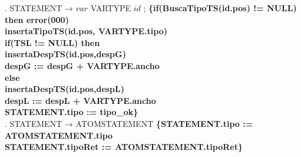 \begin{tabbing}
    . STATEMENT → $var$ VARTYPE $id$ ; \textbf{\{if(BuscaTipoTS(id.pos) != NULL)} \\
    \>              \>          \>
    \>\textbf{then error(000)}\\
    \>                    \> \textbf{insertaTipoTS(id.pos, VARTYPE.tipo)}\\
    \>                    \> \textbf{if(TSL != NULL) then }\\
    \>                    \> \> \textbf{insertaDespTS(id.pos,despG)}\\
    \>                    \> \> \textbf{despG := despG + VARTYPE.ancho}\\
    \>                    \> \textbf{else}\\
    \>                    \> \> \textbf{insertaDespTS(id.pos,despL)}\\
    \>                    \> \> \textbf{despL := despL + VARTYPE.ancho}\\
    \>                    \> \textbf{STATEMENT.tipo := tipo\_ok\}}\\
    . STATEMENT → ATOMSTATEMENT \textbf{\{STATEMENT.tipo := ATOMSTATEMENT.tipo}\\
    \>                    \> \textbf{STATEMENT.tipoRet := ATOMSTATEMENT.tipoRet\}}\\


\end{tabbing}
